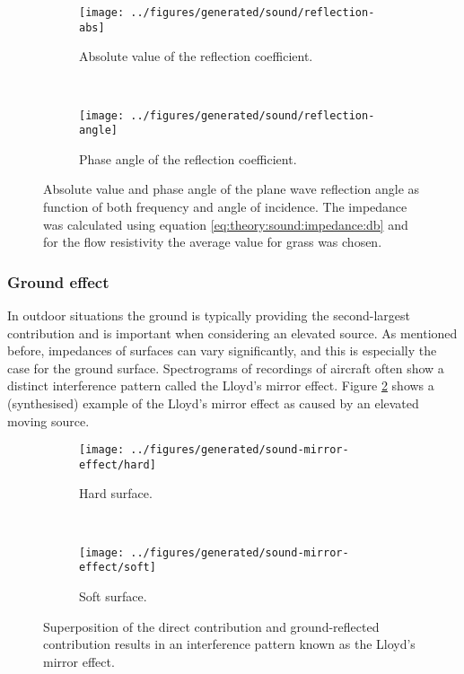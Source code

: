 \begin{figure}
    \begin{subfigure}{\textwidth}
        \texttt{[image: ../figures/generated/sound/reflection-abs]}
        \caption{Absolute value of the reflection coefficient.}
    \end{subfigure}
    ~
    \begin{subfigure}{\textwidth}
        \texttt{[image: ../figures/generated/sound/reflection-angle]}
        \caption{Phase angle of the reflection coefficient.}
    \end{subfigure}
    \caption{Absolute value and phase angle of the plane wave reflection angle as function of both frequency and angle of incidence. The impedance was calculated using equation \ref{eq:theory:sound:impedance:db} and for the flow resistivity the average value for grass was chosen.}
    \label{fig:theory:sound:reflection}
\end{figure}

\subsubsection{Ground effect}
In outdoor situations the ground is typically providing the second-largest
contribution and is important when considering an elevated source. As mentioned
before, impedances of surfaces can vary significantly, and this is especially
the case for the ground surface. Spectrograms of recordings of aircraft often
show a distinct interference pattern called the Lloyd's mirror effect. Figure
\ref{fig:theory:sound:reflection:ground} shows a (synthesised) example of the
Lloyd's mirror effect as caused by an elevated moving source.

\begin{figure}
    \begin{subfigure}{\textwidth}
        \texttt{[image: ../figures/generated/sound-mirror-effect/hard]}
        \caption{Hard surface.}
    \end{subfigure}
    ~
    \begin{subfigure}{\textwidth}
        \texttt{[image: ../figures/generated/sound-mirror-effect/soft]}
        \caption{Soft surface.}
    \end{subfigure}
    \caption{Superposition of the direct contribution and ground-reflected contribution results in an interference pattern known as the Lloyd's mirror effect.}
    \label{fig:theory:sound:reflection:ground}
\end{figure}

